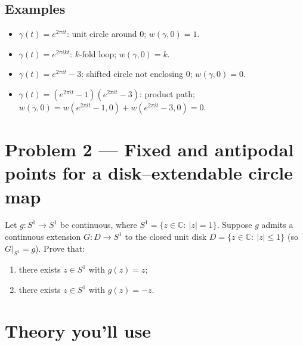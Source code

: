 \documentclass[12pt,a4paper]{article}
\theoremstyle{plain}
\theoremstyle{definition}
\theoremstyle{remark}
\theoremstyle{remark}
\begin{document}
\bigskip
\subsection*{Examples}

\begin{itemize}
	\item \( \gamma(t)=e^{2\pi i t} \): unit circle around \(0\);
	\(w(\gamma,0)=1.\)
	\item \( \gamma(t)=e^{2\pi i k t} \): \(k\)-fold loop;
	\(w(\gamma,0)=k.\)
	\item \( \gamma(t)=e^{2\pi i t}-3 \): shifted circle not enclosing \(0\);
	\(w(\gamma,0)=0.\)
	\item \( \gamma(t)=(e^{2\pi i t}-1)(e^{2\pi i t}-3) \): product path;
	\(w(\gamma,0)=w(e^{2\pi i t}-1,0)+w(e^{2\pi i t}-3,0)=0.\)
\end{itemize}

\section*{Problem 2 — Fixed and antipodal points for a disk–extendable circle map}

Let $g:S^{1}\to S^{1}$ be continuous, where $S^{1}=\{z\in\mathbb C:\ |z|=1\}$.
Suppose $g$ admits a continuous extension $G:D\to S^{1}$ to the closed unit disk
$D=\{z\in\mathbb C:\ |z|\le 1\}$ (so $G|_{S^{1}}=g$).
Prove that:
\begin{enumerate}\item[(a)]
	there exists $z\in S^{1}$ with $g(z)=z$;
	\item[(b)]
	there exists $z\in S^{1}$ with $g(z)=-z$.
\end{enumerate}

\bigskip


\section*{Theory you’ll use}
\end{document}
